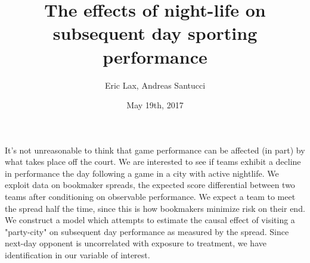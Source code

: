 \documentclass[24pt, a0paper, portrait]{tikzposter}
\title{The effects of night-life on subsequent day sporting performance}
\author{Eric Lax, Andreas Santucci}
\date{May 19th, 2017}
\institute{Institute for Computational and Mathematical Engineering}
\begin{document}
   

\maketitle

\block{~} {     It's not unreasonable to think that game performance can be affected (in part) by what takes place off the court. We are interested to see if teams exhibit a decline in performance the day following a game in a city with active nightlife. 
We exploit data on bookmaker spreads, the expected score differential between two teams after conditioning on observable performance. We expect a team to meet the spread half the time, since this is how bookmakers minimize risk on their end. We construct a model which attempts to estimate the causal effect of  visiting a "party-city" on subsequent day performance as measured by the spread. Since next-day
  opponent is uncorrelated with exposure to treatment, we have identification in our variable of 
  interest.
}

\begin{columns}


\end{columns}
\end{document}
